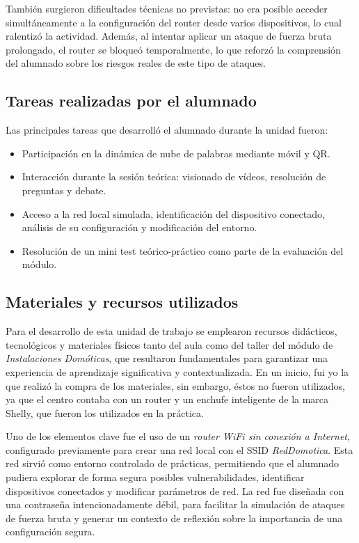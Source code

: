 También surgieron dificultades técnicas no previstas: no era posible acceder simultáneamente a la configuración del router desde varios dispositivos, lo cual ralentizó la actividad. Además, al intentar aplicar un ataque de fuerza bruta prolongado, el router se bloqueó temporalmente, lo que reforzó la comprensión del alumnado sobre los riesgos reales de este tipo de ataques.


\subsection{Tareas realizadas por el alumnado}

Las principales tareas que desarrolló el alumnado durante la unidad fueron:

\begin{itemize}
  \item Participación en la dinámica de nube de palabras mediante móvil y QR.
  \item Interacción durante la sesión teórica: visionado de vídeos, resolución de preguntas y debate.
  \item Acceso a la red local simulada, identificación del dispositivo conectado, análisis de su configuración y modificación del entorno.
  \item Resolución de un mini test teórico-práctico como parte de la evaluación del módulo.
\end{itemize}


\subsection{Materiales y recursos utilizados}

Para el desarrollo de esta unidad de trabajo se emplearon recursos didácticos, tecnológicos y materiales físicos tanto del aula como del taller del módulo de \textit{Instalaciones Domóticas}, que resultaron fundamentales para garantizar una experiencia de aprendizaje significativa y contextualizada. En un inicio, fui yo la que realizó la compra de los materiales, sin embargo, éstos no fueron utilizados, ya que el centro contaba con un router y un enchufe inteligente de la marca Shelly, que fueron los utilizados en la práctica.

Uno de los elementos clave fue el uso de un \textit{router WiFi sin conexión a Internet}, configurado previamente para crear una red local con el SSID \textit{RedDomotica}. Esta red sirvió como entorno controlado de prácticas, permitiendo que el alumnado pudiera explorar de forma segura posibles vulnerabilidades, identificar dispositivos conectados y modificar parámetros de red. La red fue diseñada con una contraseña intencionadamente débil, para facilitar la simulación de ataques de fuerza bruta y generar un contexto de reflexión sobre la importancia de una configuración segura.

